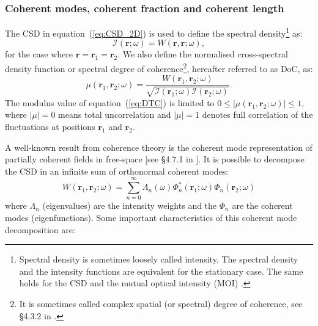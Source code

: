 \documentclass{iucr}
\begin{document}
\subsubsection{Coherent modes, coherent fraction and coherent length\\}

The CSD in equation~(\ref{eq:CSD_2D}) is used to define the spectral density\footnote{Spectral density is sometimes loosely called intensity. The spectral density and the intensity functions are equivalent for the 
stationary case. The same holds for the CSD and the mutual optical intensity (MOI) \cite{mandel_wolf}.} as:
\begin{equation}\label{eq:intensity}
    \mathcal{I}(\textbf{r};\omega)=W(\textbf{r},\textbf{r};\omega),
\end{equation}
for the case where $\textbf{r}=\textbf{r}_1=\textbf{r}_2$. We also define the normalised cross-spectral density function or spectral degree of coherence\footnote{It is sometimes called complex spatial (or spectral) degree of coherence, see §4.3.2 in \cite{mandel_wolf}.}, hereafter referred to as DoC, as:
\begin{equation}
\mu(\textbf{r}_1,\textbf{r}_2;\omega) = \frac{W(\textbf{r}_1,\textbf{r}_2;\omega)}{\sqrt{\mathcal{I}(\textbf{r}_1;\omega) \mathcal{I}(\textbf{r}_2;\omega)}}.
\label{eq:DTC}
\end{equation}
The modulus value of equation~(\ref{eq:DTC}) is limited to $0\leq|\mu(\textbf{r}_1,\textbf{r}_2;\omega)|\leq 1$, where $|\mu|=0$ means total uncorrelation and $|\mu|=1$ denotes full correlation of the fluctuations at positions $\textbf{r}_1$ and $\textbf{r}_2$. 

A well-known result from coherence theory is the coherent mode representation of partially coherent fields in free-space [see §4.7.1 in \cite{mandel_wolf}]. It is possible to decompose the CSD in an infinite sum of orthonormal coherent modes:
\begin{equation}\label{eq:W2DCMD}
W(\textbf{r}_1,\textbf{r}_2;\omega) = \sum_{n=0}^{\infty} \Lambda_n(\omega) \Phi_{n}^*(\textbf{r}_1;\omega) \Phi_{n}(\textbf{r}_2;\omega)
\end{equation}
where $\Lambda_n$ (eigenvalues) are the intensity weights and the $\Phi_n$ are the coherent modes (eigenfunctions). 
Some important characteristics of this coherent mode decomposition are: 
\end{document}

